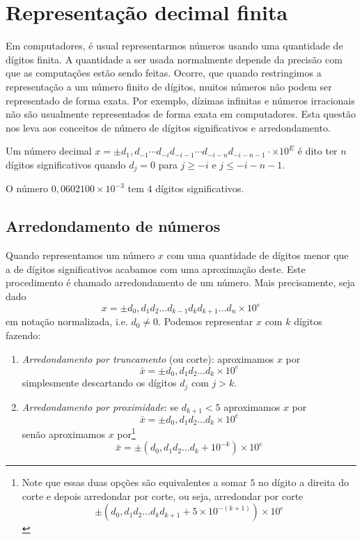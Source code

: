 \section{Representação decimal finita}

Em computadores, é usual representarmos números usando uma quantidade de dígitos finita. A quantidade a ser usada normalmente depende da precisão com que as computações estão sendo feitas. Ocorre, que quando restringimos a representação a um número finito de dígitos, muitos números não podem ser representado de forma exata. Por exemplo, dízimas infinitas e números irracionais não são usualmente representados de forma exata em computadores. Esta questão nos leva aos conceitos de número de dígitos significativos e arredondamento.

\begin{defn} Um número decimal $x = \pm d_1,d_{-1}\cdots d_{-i}d_{-i-1}\cdots d_{-i-n} d_{-i-n-1}\cdot \times 10^E$ é dito ter $n$ dígitos significativos quando $d_{j}=0$ para $j\geq -i$ e $j\leq-i-n-1$.  
\end{defn}

\begin{ex} O número $0,0602100\times 10^{-3}$ tem $4$ dígitos significativos.
\end{ex}

\subsection{Arredondamento de números}

Quando representamos um número $x$ com uma quantidade de dígitos menor que a de dígitos significativos acabamos com uma aproximação deste. Este procedimento é chamado arredondamento de um número. Mais precisamente, seja dado
\begin{equation*}
  x = \pm d_0,d_1d_2\ldots d_{k-1}d_kd_{k+1}\ldots d_n \times 10^e
\end{equation*}
em notação normalizada, i.e. $d_0\neq 0$. Podemos representar $x$ com $k$ dígitos fazendo:
\begin{enumerate}
\item \emph{Arredondamento por truncamento} (ou corte): aproximamos $x$ por
$$
  \bar{x} = \pm d_{0},d_{1}d_{2}\ldots d_{k}\times 10^e
$$
simplesmente descartando os dígitos $d_{j}$ com $j > k$.
\item \emph{Arredondamento por proximidade}: se $d_{k+1}<5$ aproximamos $x$ por
$$
  \bar{x} = \pm d_0,d_1d_2\ldots d_{k}\times 10^{e}
$$
senão aproximamos $x$ por\footnote{Note que essas duas opções são equivalentes a somar $5$ no dígito a direita do corte e depois arredondar por corte, ou seja, arredondar por corte 
$$ \pm(d_0,d_1d_2\ldots d_kd_{k+1}+ 5 \times10^{-(k+1)} )\times 10^{e} $$}
$$
 \bar{x} = \pm(d_0,d_1d_2\ldots d_{k} + 10^{-k}) \times 10^{e}
$$
\end{enumerate}


